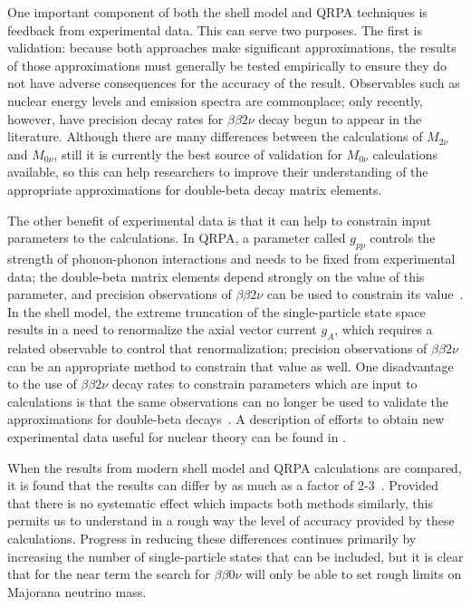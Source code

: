 One important component of both the shell model and QRPA techniques is feedback from experimental data.  This can serve two purposes.  The first is validation: because both approaches make significant approximations, the results of those approximations must generally be tested empirically to ensure they do not have adverse consequences for the accuracy of the result.  Observables such as nuclear energy levels and emission spectra are commonplace; only recently, however, have precision decay rates for $\beta\beta 2\nu$ decay begun to appear in the literature.  Although there are many differences between the calculations of $M_{2\nu}$ and $M_{0\nu}$, still it is currently the best source of validation for $M_{0\nu}$ calculations available, so this can help researchers to improve their understanding of the appropriate approximations for double-beta decay matrix elements.

The other benefit of experimental data is that it can help to constrain input parameters to the calculations.  In QRPA, a parameter called $g_{pp}$ controls the strength of phonon-phonon interactions and needs to be fixed from experimental data; the double-beta matrix elements depend strongly on the value of this parameter, and precision observations of $\beta\beta 2\nu$ can be used to constrain its value~\cite{RMPbb0n,PetrVogel0nuAnd2nuMatrixElements}.  In the shell model, the extreme truncation of the single-particle state space results in a need to renormalize the axial vector current $g_A$, which requires a related observable to control that renormalization; precision observations of $\beta\beta 2\nu$ can be an appropriate method to constrain that value as well.  One disadvantage to the use of $\beta\beta 2\nu$ decay rates to constrain parameters which are input to calculations is that the same observations can no longer be used to validate the approximations for double-beta decays~\cite{PetrVogel0nuAnd2nuMatrixElements}.  A description of efforts to obtain new experimental data useful for nuclear theory can be found in \cite{ZuberWorkshop}.

When the results from modern shell model and QRPA calculations are compared, it is found that the results can differ by as much as a factor of 2-3~\cite{RMPbb0n}.  Provided that there is no systematic effect which impacts both methods similarly, this permits us to understand in a rough way the level of accuracy provided by these calculations.  Progress in reducing these differences continues primarily by increasing the number of single-particle states that can be included, but it is clear that for the near term the search for $\beta\beta 0\nu$ will only be able to set rough limits on Majorana neutrino mass.


